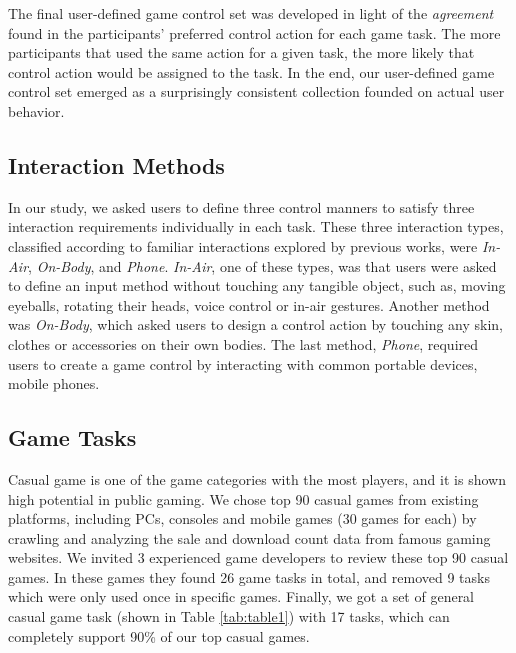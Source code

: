 \documentclass{sigchi}
\begin{document}
    The final user-defined game control set was developed in light of the \textsl{agreement} found in the participants' preferred control action for each game task\cite{Wobbrock:2005:MGS:1056808.1057043}. The more participants that used the same action for a given task, the more likely that control action would be assigned to the task. In the end, our user-defined game control set emerged as a surprisingly consistent collection founded on actual user behavior.

    \subsection {Interaction Methods}
    In our study, we asked users to define three control manners to satisfy three interaction requirements individually in each task. These three interaction types, classified according to familiar interactions explored by previous works, were \textsl{In-Air}, \textsl{On-Body}, and \textsl{Phone}. \textsl{In-Air}, one of these types, was that users were asked to define an input method without touching any tangible object, such as, moving eyeballs, rotating their heads, voice control or in-air gestures. Another method was \textsl{On-Body}, which asked users to design a control action by touching any skin, clothes or accessories on their own bodies. The last method, \textsl{Phone}, required users to create a game control by interacting with common portable devices, mobile phones.    

    \subsection {Game Tasks}
    Casual game is one of the game categories with the most players\cite{esa_ef_2014}, and it is shown high potential in public gaming\cite{Jurgelionis:2011:PET:2027456.2027462,Reis:2012:EMC:2405577.2405651,Biskupski:2014:DEB:2559206.2580097}. We chose top 90 casual games\cite{TopGames} from existing platforms, including PCs, consoles and mobile games (30 games for each) by crawling and analyzing the sale and download count data from famous gaming websites\cite{appannie,VGChartz,Steam,GameStop}. We invited 3 experienced game developers to review these top 90 casual games. In these games they found 26 game tasks in total, and removed 9 tasks which were only used once in specific games. Finally, we got a set of general casual game task (shown in Table \ref{tab:table1}) with 17 tasks, which can completely support 90\% of our top casual games. 
\end{document}

